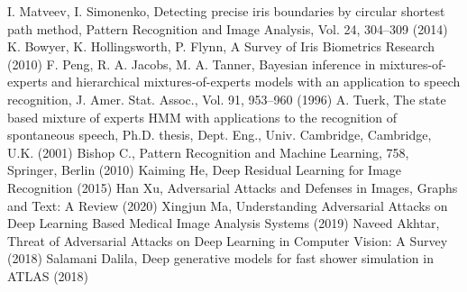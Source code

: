 \begin{thebibliography}{}
I. Matveev, I. Simonenko, Detecting precise iris boundaries by circular shortest path method, Pattern Recognition and Image Analysis, Vol. 24, 304--309 (2014)
K. Bowyer, K. Hollingsworth, P. Flynn, A Survey of Iris Biometrics Research (2010)
F. Peng, R. A. Jacobs, M. A. Tanner, Bayesian inference in mixtures-of-experts and hierarchical mixtures-of-experts models with an application to speech recognition, J. Amer. Stat. Assoc., Vol. 91, 953--960 (1996)
A. Tuerk,  The state based mixture of experts HMM with applications to the recognition of spontaneous speech, Ph.D. thesis, Dept. Eng., Univ. Cambridge, Cambridge, U.K. (2001)
Bishop C., Pattern Recognition and Machine Learning, 758, Springer, Berlin (2010)
Kaiming He, Deep Residual Learning for Image Recognition (2015)
Han Xu, Adversarial Attacks and Defenses in Images, Graphs and Text: A Review (2020)
Xingjun Ma, Understanding Adversarial Attacks on Deep Learning Based Medical Image Analysis Systems (2019)
Naveed Akhtar, Threat of Adversarial Attacks on Deep Learning in Computer Vision: A Survey (2018)
Salamani Dalila, Deep generative models for fast shower simulation in ATLAS (2018)

\end{thebibliography}



